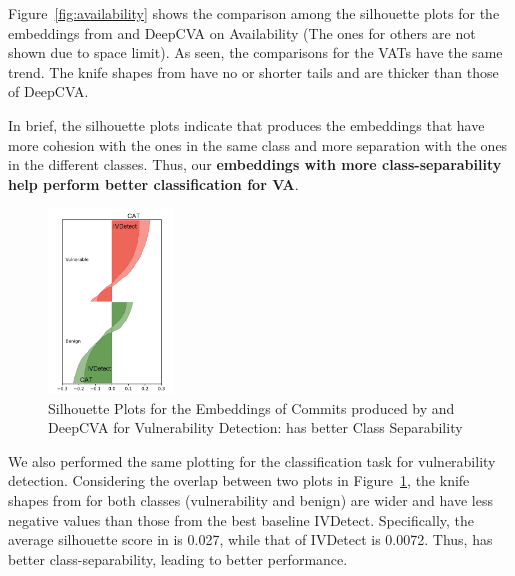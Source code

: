 Figure~\ref{fig:availability} shows the comparison among the
silhouette plots for the embeddings from {\tool} and DeepCVA on
Availability (The ones for others are not shown due to space limit).
As seen, the comparisons for the VATs have the same trend. The knife
shapes from {\tool} have no or shorter tails and are thicker than
those of DeepCVA.

In brief, the silhouette plots indicate that {\tool} produces the
embeddings that have more cohesion with the ones in the same class and
more separation with the ones in the different classes. Thus, our {\bf
embeddings with more class-separability help {\tool} perform better
classification for VA}.



\begin{figure}[t]
	\centering
	\includegraphics[width=1.3in]{graphs/plot-vd}
       \vspace{-6pt}
	\caption{Silhouette Plots for the Embeddings of Commits produced by {\tool} and DeepCVA for Vulnerability Detection: {\tool} has better Class Separability}
	\label{fig:vd}
\end{figure}

We also performed the same plotting for the classification task for
vulnerability detection. Considering the overlap between two plots in
Figure~\ref{fig:vd}, the knife shapes from {\tool} for both classes
(vulnerability and benign) are wider and have less negative values
than those from the best baseline IVDetect. Specifically, the average
silhouette score in {\tool} is 0.027, while that of IVDetect is
0.0072. Thus, {\tool} has better class-separability, leading to better
performance.
